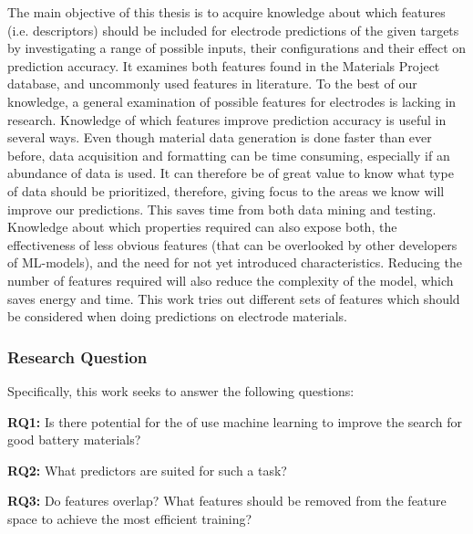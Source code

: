 	The main objective of this thesis is to acquire knowledge about which features (i.e. descriptors) should be included for electrode predictions of the given targets by investigating a range of possible inputs, their configurations and their effect on prediction accuracy. It examines both features found in the Materials Project database, and uncommonly used features in literature. To the best of our knowledge, a general examination of possible features for electrodes is lacking in research. Knowledge of which features improve prediction accuracy is useful in several ways. Even though material data generation is done faster than ever before, data acquisition and formatting can be time consuming, especially if an abundance of data is used. It can therefore be of great value to know what type of data should be prioritized, therefore, giving focus to the areas we know will improve our predictions. This saves time from both data mining and testing. Knowledge about which properties required can also expose both, the effectiveness of less obvious features (that can be overlooked by other developers of ML-models), and the need for not yet introduced characteristics. Reducing the number of features required will also reduce the complexity of the model, which saves energy and time. This work tries out different sets of features which should be considered when doing predictions on electrode materials.



\subsubsection{Research Question} \label{sec:RQ}

Specifically, this work seeks to answer the following questions: 

\textbf{\ac{RQ}1:} Is there potential for the of use machine learning to improve the search for good battery materials?

\textbf{RQ2:} What predictors are suited for such a task?

\textbf{RQ3:} Do features overlap? What features should be removed from the feature space to achieve the most efficient training?

